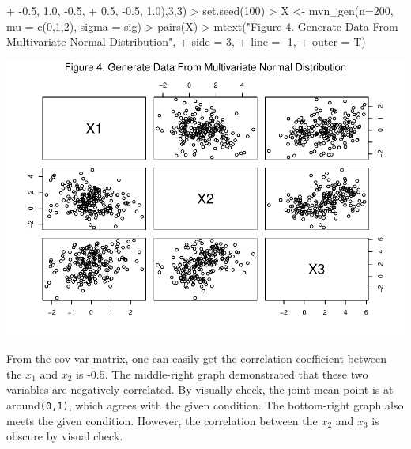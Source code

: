 \documentclass[
]{article}
\newenvironment{Shaded}{\begin{snugshade}}{\end{snugshade}}
\newcommand{\AttributeTok}[1]{\textcolor[rgb]{0.77,0.63,0.00}{#1}}
\newcommand{\DecValTok}[1]{\textcolor[rgb]{0.00,0.00,0.81}{#1}}
\newcommand{\FloatTok}[1]{\textcolor[rgb]{0.00,0.00,0.81}{#1}}
\newcommand{\FunctionTok}[1]{\textcolor[rgb]{0.00,0.00,0.00}{#1}}
\newcommand{\NormalTok}[1]{#1}
\newcommand{\OtherTok}[1]{\textcolor[rgb]{0.56,0.35,0.01}{#1}}
\newcommand{\SpecialCharTok}[1]{\textcolor[rgb]{0.00,0.00,0.00}{#1}}
\newcommand{\StringTok}[1]{\textcolor[rgb]{0.31,0.60,0.02}{#1}}
\begin{document}
\begin{Shaded}
\begin{Highlighting}[]
\SpecialCharTok{+}                 \SpecialCharTok{{-}}\FloatTok{0.5}\NormalTok{, }\FloatTok{1.0}\NormalTok{, }\SpecialCharTok{{-}}\FloatTok{0.5}\NormalTok{,}
\SpecialCharTok{+}                 \FloatTok{0.5}\NormalTok{, }\SpecialCharTok{{-}}\FloatTok{0.5}\NormalTok{, }\FloatTok{1.0}\NormalTok{),}\DecValTok{3}\NormalTok{,}\DecValTok{3}\NormalTok{)}
\SpecialCharTok{\textgreater{}} \FunctionTok{set.seed}\NormalTok{(}\DecValTok{100}\NormalTok{)}
\SpecialCharTok{\textgreater{}}\NormalTok{ X }\OtherTok{\textless{}{-}} \FunctionTok{mvn\_gen}\NormalTok{(}\AttributeTok{n=}\DecValTok{200}\NormalTok{, }\AttributeTok{mu =} \FunctionTok{c}\NormalTok{(}\DecValTok{0}\NormalTok{,}\DecValTok{1}\NormalTok{,}\DecValTok{2}\NormalTok{), }\AttributeTok{sigma =}\NormalTok{ sig)}
\SpecialCharTok{\textgreater{}} \FunctionTok{pairs}\NormalTok{(X)}
\SpecialCharTok{\textgreater{}} \FunctionTok{mtext}\NormalTok{(}\StringTok{"Figure 4. Generate Data From Multivariate Normal Distribution"}\NormalTok{,}
\SpecialCharTok{+}       \AttributeTok{side =} \DecValTok{3}\NormalTok{,}
\SpecialCharTok{+}       \AttributeTok{line =} \SpecialCharTok{{-}}\DecValTok{1}\NormalTok{,}
\SpecialCharTok{+}       \AttributeTok{outer =}\NormalTok{ T)}
\end{Highlighting}
\end{Shaded}

\includegraphics[width=1\linewidth,height=0.5\textheight]{HW_02_Chenguang_Pan_files/figure-latex/unnamed-chunk-5-1}

From the cov-var matrix, one can easily get the correlation coefficient
between the \(x_1\) and \(x_2\) is -0.5. The middle-right graph
demonstrated that these two variables are negatively correlated. By
visually check, the joint mean point is at around\texttt{(0,1)}, which
agrees with the given condition. The bottom-right graph also meets the
given condition. However, the correlation between the \(x_2\) and
\(x_3\) is obscure by visual check.
\end{document}
